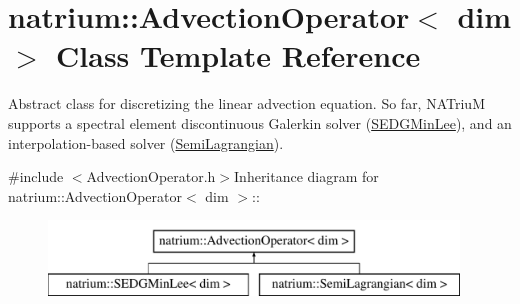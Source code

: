 \hypertarget{classnatrium_1_1AdvectionOperator}{
\section{natrium::AdvectionOperator$<$ dim $>$ Class Template Reference}
\label{classnatrium_1_1AdvectionOperator}
}


Abstract class for discretizing the linear advection equation. So far, NATriuM supports a spectral element discontinuous Galerkin solver (\hyperlink{classnatrium_1_1SEDGMinLee}{SEDGMinLee}), and an interpolation-\/based solver (\hyperlink{classnatrium_1_1SemiLagrangian}{SemiLagrangian}).  


{\ttfamily \#include $<$AdvectionOperator.h$>$}Inheritance diagram for natrium::AdvectionOperator$<$ dim $>$::\begin{figure}[H]
\begin{center}
\leavevmode
\includegraphics[height=2cm]{classnatrium_1_1AdvectionOperator}
\end{center}
\end{figure}
